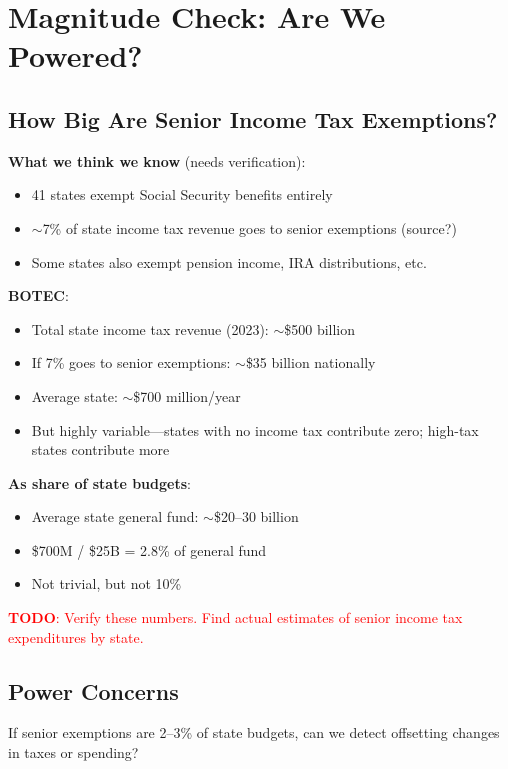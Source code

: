 \documentclass[11pt]{article}
\begin{document}
\section{Magnitude Check: Are We Powered?}

\subsection{How Big Are Senior Income Tax Exemptions?}

\textbf{What we think we know} (needs verification):
\begin{itemize}
    \item 41 states exempt Social Security benefits entirely
    \item $\sim$7\% of state income tax revenue goes to senior exemptions (source?)
    \item Some states also exempt pension income, IRA distributions, etc.
\end{itemize}

\textbf{BOTEC}:
\begin{itemize}
    \item Total state income tax revenue (2023): $\sim$\$500 billion
    \item If 7\% goes to senior exemptions: $\sim$\$35 billion nationally
    \item Average state: $\sim$\$700 million/year
    \item But highly variable---states with no income tax contribute zero; high-tax states contribute more
\end{itemize}

\textbf{As share of state budgets}:
\begin{itemize}
    \item Average state general fund: $\sim$\$20--30 billion
    \item \$700M / \$25B = 2.8\% of general fund
    \item Not trivial, but not 10\%
\end{itemize}

\textcolor{red}{\textbf{TODO}: Verify these numbers. Find actual estimates of senior income tax expenditures by state.}

\subsection{Power Concerns}

If senior exemptions are 2--3\% of state budgets, can we detect offsetting changes in taxes or spending?
\end{document}
